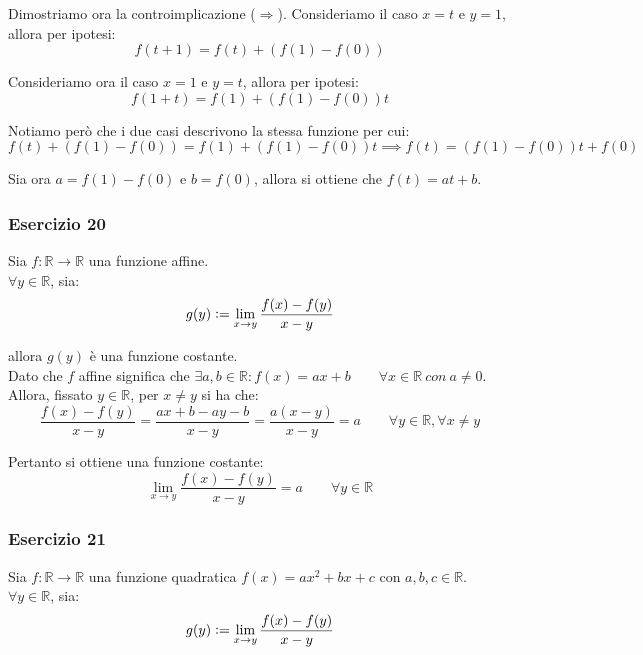 \documentclass{article}
\begin{document}
\noindent Dimostriamo ora la controimplicazione ($\Rightarrow$). Consideriamo il caso $x = t$ e $y = 1$, allora per ipotesi:
\begin{equation*}
    f(t + 1) = f(t) + (f(1) - f(0))
\end{equation*}

\noindent Consideriamo ora il caso $x = 1$ e $y = t$, allora per ipotesi:
\begin{equation*}
    f(1 + t) = f(1) + (f(1) - f(0))t
\end{equation*}

\noindent Notiamo però che i due casi descrivono la stessa funzione per cui:
\begin{equation*}
    f(t) + (f(1) - f(0)) = f(1) + (f(1) - f(0))t \implies f(t) = (f(1) - f(0))t + f(0)
\end{equation*}

\noindent Sia ora $a = f(1) - f(0)$ e $b = f(0)$, allora si ottiene che $f(t) = at + b$.

\subsubsection{Esercizio 20}
Sia $f: \mathbb{R} \xrightarrow{} \mathbb{R}$ una funzione affine.\\
$\forall y \in \mathbb{R}$, sia:
\begin{equation*}
    g(y) \vcentcolon = \lim_{x \to y} \frac{f(x) - f(y)}{x - y}
\end{equation*}

\noindent allora $g(y)$ è una funzione costante.\\

\noindent Dato che $f$ affine significa che $\exists a, b \in \mathbb{R} : f(x) = ax + b \qquad \forall x \in \mathbb{R} \ con \ a \neq 0$. Allora, fissato $y \in \mathbb{R}$, per $x \neq y$ si ha che:
\begin{equation*}
    \frac{f(x) - f(y)}{x - y} = \frac{ax + b - ay - b}{x - y} = \frac{a(x - y)}{x - y} = a \qquad \forall y \in \mathbb{R}, \forall x \neq y
\end{equation*}

\noindent Pertanto si ottiene una funzione costante: 
\begin{equation*}
    \lim_{x \to y} \frac{f(x) - f(y)}{x - y} = a \qquad \forall y \in \mathbb{R}
\end{equation*}

\subsubsection{Esercizio 21}
Sia $f: \mathbb{R} \xrightarrow{} \mathbb{R}$ una funzione quadratica $f(x) = ax^2 + bx + c$ con $a, b, c \in \mathbb{R}$.\\
$\forall y \in \mathbb{R}$, sia:
\begin{equation*}
    g(y) \vcentcolon = \lim_{x \to y} \frac{f(x) - f(y)}{x - y}
\end{equation*}
\end{document}
